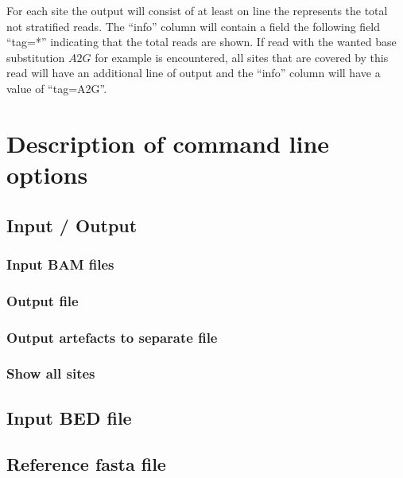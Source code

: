 \documentclass[10pt,a4paper,final]{article}
\begin{document}
For each site the output will consist of at least on line the represents the total not stratified reads.
The ``info'' column will contain a field the following field ``tag=*'' indicating that the total 
reads are shown. If read with the wanted base substitution $A2G$ for example is encountered, all sites 
that are covered by this read will have an additional line of output and the ``info'' column will have 
a value of ``tag=A2G''. 
\section{Description of command line options}
\subsection{Input / Output}
\subsubsection{Input BAM files}
\subsubsection{Output file}

\subsubsection{Output artefacts to separate file}\label{sec:separate_output}

\subsubsection{Show all sites}

\subsection{Input BED file}

\subsection{Reference fasta file}

\end{document}
